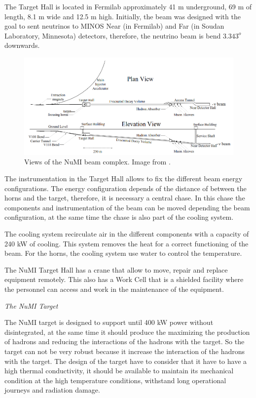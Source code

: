 The Target Hall is located in Fermilab approximately 41 m underground, 69 m of length, 8.1 m wide and 12.5 m high. Initially, the beam was designed with the goal to sent neutrinos to MINOS Near (in Fermilab) and Far (in Soudan Laboratory, Minnesota) detectors, therefore, the neutrino beam is bend $3.343^o$ downwards.  

\begin{figure}[!htb]
\centering
\includegraphics[scale=0.4]{Figures/Chapter2/NuMIFacilityViews.png}
        \caption{Views of the NuMI beam complex. Image from \cite{Numi}.} 
\label{fig:MnvExp:NuMI:NuMIBeamComponents}
\end{figure}

The instrumentation in the Target Hall allows to fix the different beam energy configurations. The energy configuration depends of the distance of between the horns and the target, therefore, it is necessary a central chase. In this chase the components and instrumentation of the beam can be moved depending the beam configuration, at  the same time the chase is also part of the cooling system. 

The cooling system recirculate air in the different components with a capacity of 240 kW of cooling. This system removes the heat for a correct functioning of the beam. For the horns, the cooling system use water to control the temperature.

The NuMI Target Hall has a crane that allow to move, repair and replace equipment remotely. This also has a Work Cell that is a shielded facility where the personnel can access and work in the maintenance of the equipment. 

\textit{The NuMI Target}

The NuMI target is designed to support until 400 kW power without disintegrated, at the same time it should produce the maximizing the production of hadrons and reducing the interactions of the hadrons with the target. So the target can not be very robust because it increase the interaction of the hadrons with the target. The design of the target have to consider that it have to have a high thermal conductivity, it should be available to maintain its mechanical condition at the high temperature conditions, withstand long operational journeys and radiation damage. 

